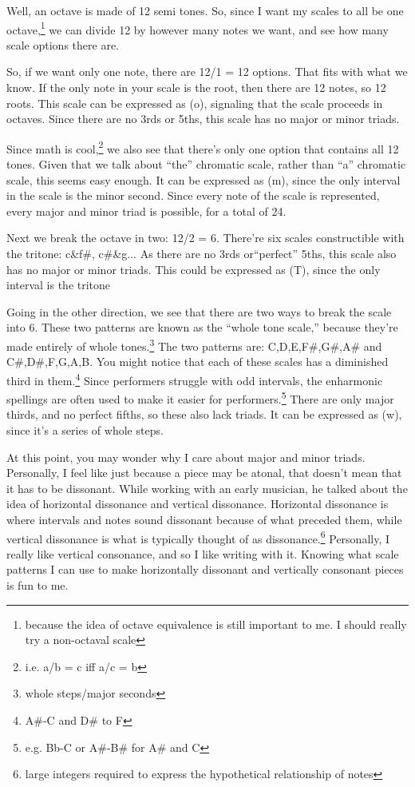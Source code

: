 \documentclass[12pt]{article}[titlepage]
\newcommand{\say}[1]{``#1''}
\newcommand{\1}{\={a}}
\newcommand{\2}{\={e}}
\newcommand{\3}{\={\i}}
\newcommand{\4}{\=o}
\newcommand{\5}{\=u}
\newcommand{\6}{\={A}}
\renewcommand{\,}{\textsuperscript{,}}
\begin{document}
Well, an octave is made of 12 semi tones.
So, since I want my scales to all be one octave,\footnote{because the idea of octave equivalence is still important to me. I should really try a non-octaval scale} we can divide 12 by however many notes we want, and see how many scale options there are.

So, if we want only one note, there are 12/1 = 12 options.
That fits with what we know.
If the only note in your scale is the root, then there are 12 notes, so 12 roots.
This scale can be expressed as (o), signaling that the scale proceeds in octaves.
Since there are no 3rds or 5ths, this scale has no major or minor triads.

Since math is cool,\footnote{i.e. a/b = c iff a/c = b} we also see that there's only one option that contains all 12 tones.
Given that we talk about \say{the} chromatic scale, rather than \say{a} chromatic scale, this seems easy enough.
It can be expressed as (m), since the only interval in the scale is the minor second.
Since every note of the scale is represented, every major and minor triad is possible, for a total of 24.

Next we break the octave in two: 12/2 = 6.
There're six scales constructible with the tritone: c\&f\#, c\#\&g...
As there are no 3rds or\say{perfect} 5ths, this scale also has no major or minor triads.
This could be expressed as (T), since the only interval is the tritone

Going in the other direction, we see that there are two ways to break the scale into 6.
These two patterns are known as the \say{whole tone scale,} because they're made entirely of whole tones.\footnote{whole steps/major seconds}
The two patterns are: C,D,E,F\#,G\#,A\# and C\#,D\#,F,G,A,B.
You might notice that each of these scales has a diminished third in them.\footnote{A\#-C and D\# to F}
Since performers struggle with odd intervals, the enharmonic spellings are often used to make it easier for performers.\footnote{e.g. Bb-C or A\#-B\# for A\# and C}
There are only major thirds, and no perfect fifths, so these also lack triads.
It can be expressed as (w), since it's a series of whole steps.

At this point, you may wonder why I care about major and minor triads.
Personally, I feel like just because a piece may be atonal, that doesn't mean that it has to be dissonant.
While working with an early musician, he talked about the idea of horizontal dissonance and vertical dissonance.
Horizontal dissonance is where intervals and notes sound dissonant because of what preceded them, while vertical dissonance is what is typically thought of as dissonance.\footnote{large integers required to express the hypothetical relationship of notes}
Personally, I really like vertical consonance, and so I like writing with it.
Knowing what scale patterns I can use to make horizontally dissonant and vertically consonant pieces is fun to me.
\end{document}
